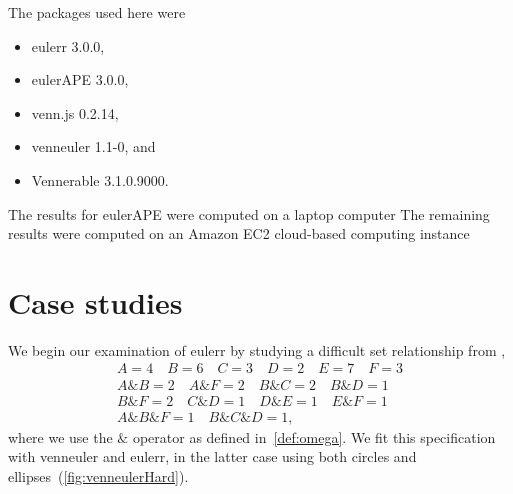 \documentclass[
  oneside,
  openany,
  numbers=noendperiod,
  parskip=half,
  bibliography=totoc
]{scrbook}\usepackage[]{graphicx}\usepackage{xcolor}
\newcommand{\pkg}[1]{{\fontseries{b}\selectfont #1}}
\begin{document}
The packages used here were
\begin{itemize}
  \item \pkg{eulerr} 3.0.0,
  \item \pkg{eulerAPE} 3.0.0,
  \item \pkg{venn.js} 0.2.14,
  \item \pkg{venneuler} 1.1-0, and
  \item \pkg{Vennerable} 3.1.0.9000.
\end{itemize}

The results for \pkg{eulerAPE}
were computed on a laptop computer
The remaining results were computed on an Amazon EC2
cloud-based computing instance

\section{Case studies}
\label{sec:caseStudies}

We begin our examination of \pkg{eulerr} by studying a difficult set
relationship from \citet{wilkinson_2012},
\begin{gather*}
A = 4 \quad B = 6 \quad C = 3 \quad D = 2 \quad E = 7 \quad F = 3\\
A\& B = 2 \quad A\&F = 2 \quad B\& C = 2 \quad B\&D = 1 \\
B\& F = 2 \quad C\&D = 1 \quad D\& E = 1 \quad E\&F = 1 \\
A\&B\&F = 1 \quad B\&C\&D = 1,\end{gather*}
where we use the $\&$ operator as defined in~\cref{def:omega}. We fit this
specification with \pkg{venneuler} and \pkg{eulerr}, in the latter case using
both circles and ellipses~(\cref{fig:venneulerHard}).
\end{document}
